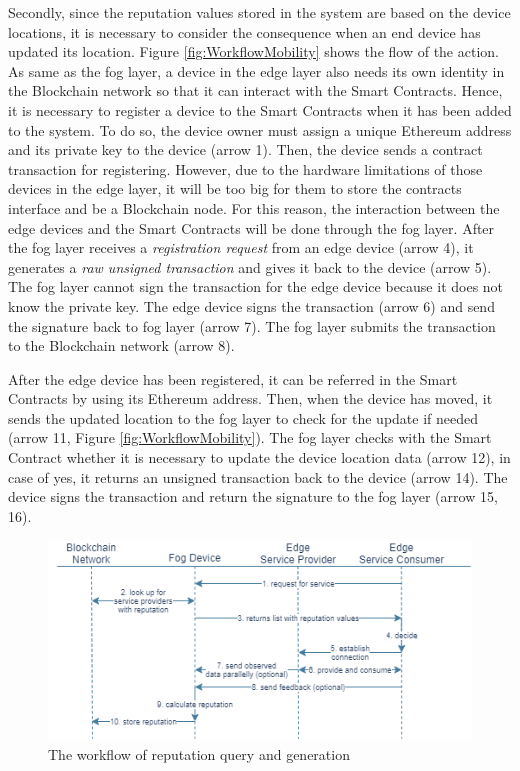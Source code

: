 \npara Secondly, since the reputation values stored in the system are based on the device locations, it is necessary to consider the consequence when an end device has updated its location.
Figure \ref{fig:WorkflowMobility} shows the flow of the action.
As same as the fog layer, a device in the edge layer also needs its own identity in the Blockchain network so that it can interact with the Smart Contracts.
Hence, it is necessary to register a device to the Smart Contracts when it has been added to the system.
To do so, the device owner must assign a unique Ethereum address and its private key to the device (arrow 1).
Then, the device sends a contract transaction for registering.
However, due to the hardware limitations of those devices in the edge layer, it will be too big for them to store the contracts interface and be a Blockchain node.
For this reason, the interaction between the edge devices and the Smart Contracts will be done through the fog layer.
After the fog layer receives a \textit{registration request} from an edge device (arrow 4), it generates a \textit{raw unsigned transaction} and gives it back to the device (arrow 5).
The fog layer cannot sign the transaction for the edge device because it does not know the private key.
The edge device signs the transaction (arrow 6) and send the signature back to fog layer (arrow 7).
The fog layer submits the transaction to the Blockchain network (arrow 8).

\npara After the edge device has been registered, it can be referred in the Smart Contracts by using its Ethereum address.
Then, when the device has moved, it sends the updated location to the fog layer to check for the update if needed (arrow 11, Figure \ref{fig:WorkflowMobility}).
The fog layer checks with the Smart Contract whether it is necessary to update the device location data (arrow 12), in case of yes, it returns an unsigned transaction back to the device (arrow 14).
The device signs the transaction and return the signature to the fog layer (arrow 15, 16).

\begin{figure}[htb!]
  \centering
  \includegraphics[width=\textwidth]{images/WorkflowReputation.png}
  \caption{The workflow of reputation query and generation}
  \label{fig:WorkflowReputation}
\end{figure}

